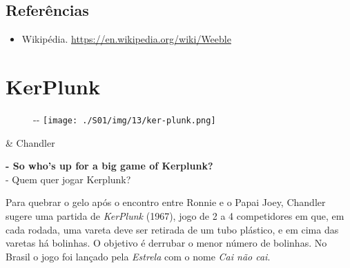 \hypertarget{referuxeancias}{%
\subsection{Referências}\label{referuxeancias}}

\begin{itemize}
\tightlist
\item
  \sloppy Wikipédia. \url{https://en.wikipedia.org/wiki/Weeble}
\end{itemize}

\hypertarget{kerplunk}{%
\section{KerPlunk}\label{kerplunk}}

\begin{figure}[!ht]
  \begin{adjustwidth}{-\oddsidemargin-1in}{-\rightmargin}
    \centering
    \texttt{[image: ./S01/img/13/ker-plunk.png]}
  \end{adjustwidth}
\end{figure}

\begin{tcolorbox}[enhanced,center upper,
    drop fuzzy shadow southeast, boxrule=0.3pt,
    lower separated=false, breakable,
    colframe=black!30!dialogoBorder,colback=white]
\begin{minipage}[c]{0.16\linewidth}
   & \centering \scriptsize{Chandler}
\end{minipage}
\hfill
\begin{minipage}[c]{0.8\linewidth}
  \textbf{- So who's up for a big game of Kerplunk?}\\
  - Quem quer jogar Kerplunk?
\end{minipage}
\end{tcolorbox}

Para quebrar o gelo após o encontro entre Ronnie e o Papai Joey,
Chandler sugere uma partida de \emph{KerPlunk} (1967), jogo de 2 a 4
competidores em que, em cada rodada, uma vareta deve ser retirada de um
tubo plástico, e em cima das varetas há bolinhas. O objetivo é derrubar
o menor número de bolinhas. No Brasil o jogo foi lançado pela
\emph{Estrela} com o nome \emph{Cai não cai}.

